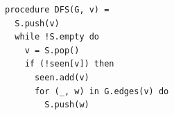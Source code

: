 \begin{lstlisting}[language=imperative]
procedure DFS(G, v) = 
  S.push(v)
  while !S.empty do
    v = S.pop()
    if (!seen[v]) then
      seen.add(v)
      for (_, w) in G.edges(v) do 
        S.push(w)
\end{lstlisting}